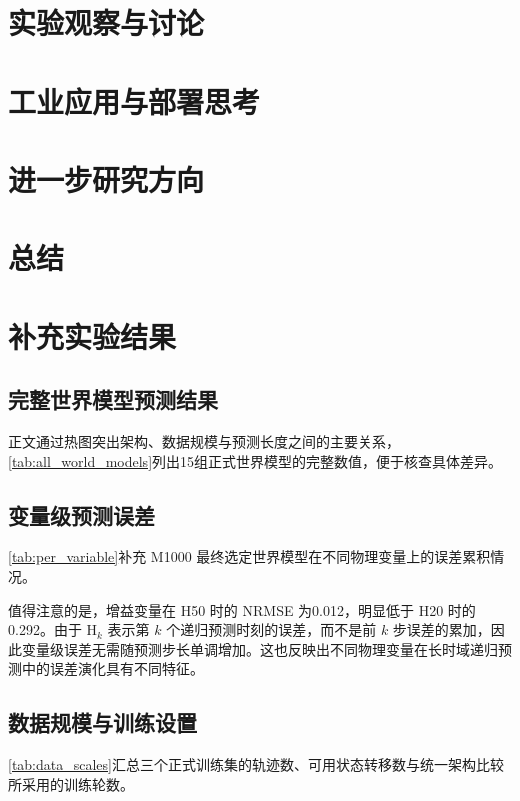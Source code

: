 \documentclass[11pt,a4paper,fontset=fandol]{ctexart}
\begin{document}
\section{实验观察与讨论}
\label{sec:discussion}


\section{工业应用与部署思考}
\label{sec:industry}


\section{进一步研究方向}
\label{sec:future}


\section{总结}
\label{sec:conclusion}


\appendix
\section{补充实验结果}
\label{sec:appendix_results}

\subsection{完整世界模型预测结果}
\label{sec:appendix_world_models}
正文通过热图突出架构、数据规模与预测长度之间的主要关系，\cref{tab:all_world_models}列出15组正式世界模型的完整数值，便于核查具体差异。


\subsection{变量级预测误差}
\label{sec:appendix_variables}
\cref{tab:per_variable}补充 M1000 最终选定世界模型在不同物理变量上的误差累积情况。


值得注意的是，增益变量在 H50 时的 NRMSE 为0.012，明显低于 H20 时的0.292。由于 $\mathrm{H}_k$ 表示第 $k$ 个递归预测时刻的误差，而不是前 $k$ 步误差的累加，因此变量级误差无需随预测步长单调增加。这也反映出不同物理变量在长时域递归预测中的误差演化具有不同特征。

\subsection{数据规模与训练设置}
\label{sec:appendix_training}
\cref{tab:data_scales}汇总三个正式训练集的轨迹数、可用状态转移数与统一架构比较所采用的训练轮数。

\end{document}
